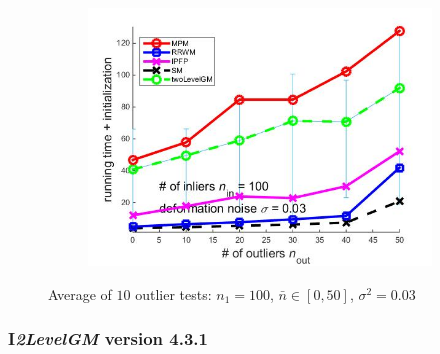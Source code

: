 \documentclass[
	fontsize=12pt,
	paper=a4,
	twoside=false,
	numbers=noenddot,
	plainheadsepline,
	toc=listof,
	toc=bibliography
]{scrartcl}
\begin{document}
\begin{figure}[h]
\begin{subfigure}[b]{0.3\textwidth}
		\includegraphics[scale=0.25]{"fig_ver2608/syntheticPointSets/ver4.3.1/outliertest_n50/time_summary_avg10t"} 
	\end{subfigure} 	
	\caption{Average of $10$ outlier tests: $n_1=100$, $\bar{n}\in[0,50]$, $\sigma^2=0.03$}
	\label{fig:test3_ver431}
\end{figure}

\FloatBarrier

\subsubsection{I\emph{2LevelGM} version 4.3.1}
\end{document}
